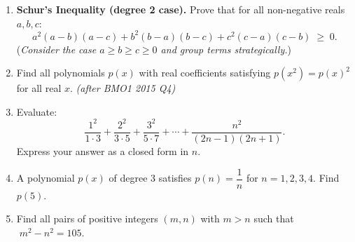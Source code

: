 \documentclass[11pt,a4paper]{article}
\begin{document}
\begin{enumerate}

\item \textbf{Schur's Inequality (degree 2 case).}
      Prove that for all non-negative reals $a, b, c$:
\[
  a^2(a-b)(a-c) + b^2(b-a)(b-c) + c^2(c-a)(c-b) \;\geq\; 0.
\]
(\textit{Consider the case $a \geq b \geq c \geq 0$ and group terms strategically.})

\item Find all polynomials $p(x)$ with real coefficients satisfying
      $p(x^2) = p(x)^2$ for all real $x$. \textit{\small(after BMO1 2015 Q4)}

\item Evaluate:
\[
  \frac{1^2}{1\cdot3} + \frac{2^2}{3\cdot5} + \frac{3^2}{5\cdot7}
    + \cdots + \frac{n^2}{(2n-1)(2n+1)}.
\]
Express your answer as a closed form in $n$.

\item A polynomial $p(x)$ of degree 3 satisfies $p(n) = \dfrac{1}{n}$
      for $n = 1, 2, 3, 4$.  Find $p(5)$.

\item Find all pairs of positive integers $(m, n)$ with $m > n$
      such that $\;m^2 - n^2 = 105$.

\end{enumerate}

\end{document}
